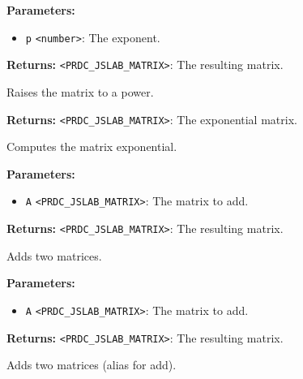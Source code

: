 \documentclass[12pt,a4paper]{article}
\begin{document}
\noindent \textbf{Parameters:}
\begin{itemize}
  \item \texttt{p} \texttt{<number>}: The exponent.
\end{itemize}

\noindent \textbf{Returns:} \texttt{<PRDC\_JSLAB\_MATRIX>}: The resulting matrix.

\noindent Raises the matrix to a power.

\vspace{5mm}
\noindent {}


\noindent \textbf{Returns:} \texttt{<PRDC\_JSLAB\_MATRIX>}: The exponential matrix.

\noindent Computes the matrix exponential.

\vspace{5mm}
\noindent {}


\noindent \textbf{Parameters:}
\begin{itemize}
  \item \texttt{A} \texttt{<PRDC\_JSLAB\_MATRIX>}: The matrix to add.
\end{itemize}

\noindent \textbf{Returns:} \texttt{<PRDC\_JSLAB\_MATRIX>}: The resulting matrix.

\noindent Adds two matrices.

\vspace{5mm}
\noindent {}


\noindent \textbf{Parameters:}
\begin{itemize}
  \item \texttt{A} \texttt{<PRDC\_JSLAB\_MATRIX>}: The matrix to add.
\end{itemize}

\noindent \textbf{Returns:} \texttt{<PRDC\_JSLAB\_MATRIX>}: The resulting matrix.

\noindent Adds two matrices (alias for add).

\vspace{5mm}
\noindent {}
\end{document}
